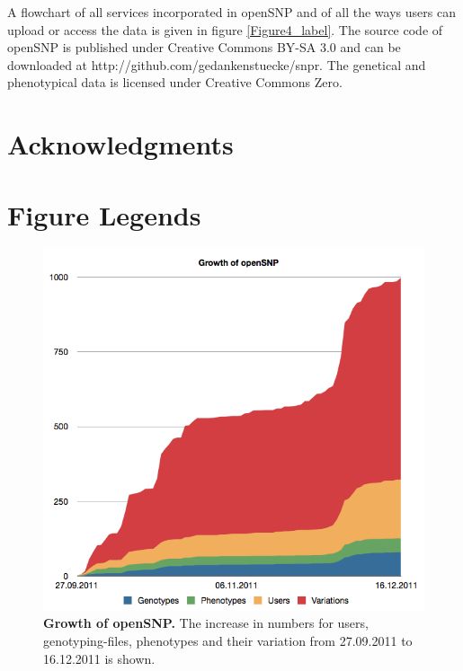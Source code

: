 \documentclass[10pt]{article}
\begin{document}
A flowchart of all services incorporated in openSNP and of all the ways users can upload or access the data is given in figure \ref{Figure4_label}. The source code of openSNP is 
published under Creative Commons BY-SA 3.0 and can be downloaded at http://github.com/gedankenstuecke/snpr. The genetical and phenotypical data is licensed under Creative Commons Zero. 
\section*{Acknowledgments}




\section*{Figure Legends}
\begin{figure}[!ht]
	\begin{center}
		\includegraphics[scale=0.35]{chart_growth.png}
	\end{center}
	\caption{
	{\bf Growth of openSNP.} The increase in numbers for users, genotyping-files, phenotypes and their variation from 27.09.2011 to 16.12.2011 is shown.} 
	\label{Figure1_label}
\end{figure}
\end{document}
